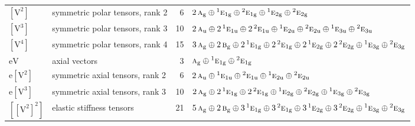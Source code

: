 \documentclass[10pt,a4paper]{article}
\numberwithin{equation}{section}
\newcommand{\irr}[1]{\text{\normalfont\scshape #1}}
\newcommand{\conjpair}[1]{{}^{#1}}
\newcommand{\ptag}[1]{\mathrm{#1}}
\newcommand{\jahn}[1]{\mathrm{#1}}
\newlength{\fillwidth}\newlength{\cellwidth}\newlength{\colwidth}
\begin{document}
{\begin{longtable}{@{}llr>{\RaggedRight\arraybackslash}p{\fillwidth}@{}}
$\jahn{[V^{2}]}$ & symmetric polar tensors, rank 2 & 6 & $2\,\irr{a}_{\ptag{g}} \oplus\allowbreak \conjpair{1}\irr{e}_{1\ptag{g}} \oplus\allowbreak \conjpair{2}\irr{e}_{1\ptag{g}} \oplus\allowbreak \conjpair{1}\irr{e}_{2\ptag{g}} \oplus\allowbreak \conjpair{2}\irr{e}_{2\ptag{g}}$\\
$\jahn{[V^{3}]}$ & symmetric polar tensors, rank 3 & 10 & $2\,\irr{a}_{\ptag{u}} \oplus\allowbreak 2\,\conjpair{1}\irr{e}_{1\ptag{u}} \oplus\allowbreak 2\,\conjpair{2}\irr{e}_{1\ptag{u}} \oplus\allowbreak \conjpair{1}\irr{e}_{2\ptag{u}} \oplus\allowbreak \conjpair{2}\irr{e}_{2\ptag{u}} \oplus\allowbreak \conjpair{1}\irr{e}_{3\ptag{u}} \oplus\allowbreak \conjpair{2}\irr{e}_{3\ptag{u}}$\\
$\jahn{[V^{4}]}$ & symmetric polar tensors, rank 4 & 15 & $3\,\irr{a}_{\ptag{g}} \oplus\allowbreak 2\,\irr{b}_{\ptag{g}} \oplus\allowbreak 2\,\conjpair{1}\irr{e}_{1\ptag{g}} \oplus\allowbreak 2\,\conjpair{2}\irr{e}_{1\ptag{g}} \oplus\allowbreak 2\,\conjpair{1}\irr{e}_{2\ptag{g}} \oplus\allowbreak 2\,\conjpair{2}\irr{e}_{2\ptag{g}} \oplus\allowbreak \conjpair{1}\irr{e}_{3\ptag{g}} \oplus\allowbreak \conjpair{2}\irr{e}_{3\ptag{g}}$\\
$\jahn{eV}$ & axial vectors & 3 & $\irr{a}_{\ptag{g}} \oplus\allowbreak \conjpair{1}\irr{e}_{1\ptag{g}} \oplus\allowbreak \conjpair{2}\irr{e}_{1\ptag{g}}$\\
$\jahn{e[V^{2}]}$ & symmetric axial tensors, rank 2 & 6 & $2\,\irr{a}_{\ptag{u}} \oplus\allowbreak \conjpair{1}\irr{e}_{1\ptag{u}} \oplus\allowbreak \conjpair{2}\irr{e}_{1\ptag{u}} \oplus\allowbreak \conjpair{1}\irr{e}_{2\ptag{u}} \oplus\allowbreak \conjpair{2}\irr{e}_{2\ptag{u}}$\\
$\jahn{e[V^{3}]}$ & symmetric axial tensors, rank 3 & 10 & $2\,\irr{a}_{\ptag{g}} \oplus\allowbreak 2\,\conjpair{1}\irr{e}_{1\ptag{g}} \oplus\allowbreak 2\,\conjpair{2}\irr{e}_{1\ptag{g}} \oplus\allowbreak \conjpair{1}\irr{e}_{2\ptag{g}} \oplus\allowbreak \conjpair{2}\irr{e}_{2\ptag{g}} \oplus\allowbreak \conjpair{1}\irr{e}_{3\ptag{g}} \oplus\allowbreak \conjpair{2}\irr{e}_{3\ptag{g}}$\\
$\jahn{[[V^{2}]^{2}]}$ & elastic stiffness tensors & 21 & $5\,\irr{a}_{\ptag{g}} \oplus\allowbreak 2\,\irr{b}_{\ptag{g}} \oplus\allowbreak 3\,\conjpair{1}\irr{e}_{1\ptag{g}} \oplus\allowbreak 3\,\conjpair{2}\irr{e}_{1\ptag{g}} \oplus\allowbreak 3\,\conjpair{1}\irr{e}_{2\ptag{g}} \oplus\allowbreak 3\,\conjpair{2}\irr{e}_{2\ptag{g}} \oplus\allowbreak \conjpair{1}\irr{e}_{3\ptag{g}} \oplus\allowbreak \conjpair{2}\irr{e}_{3\ptag{g}}$\\

\end{longtable}}
\end{document}
